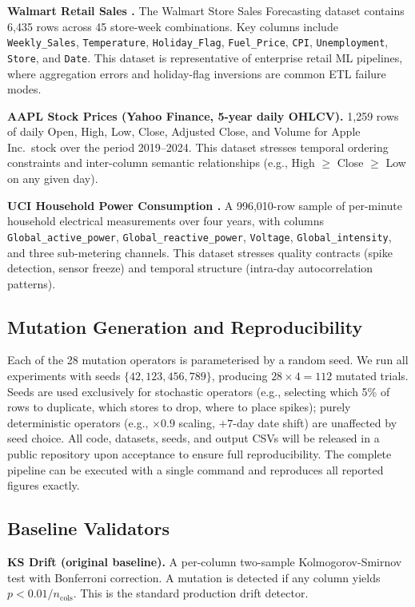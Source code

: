 \documentclass[journal]{IEEEtran}
\begin{document}
\textbf{Walmart Retail Sales \cite{walmart2014kaggle}.}  The Walmart Store
Sales Forecasting dataset contains 6,435 rows across 45 store-week
combinations.  Key columns include \texttt{Weekly\_Sales},
\texttt{Temperature}, \texttt{Holiday\_Flag}, \texttt{Fuel\_Price},
\texttt{CPI}, \texttt{Unemployment}, \texttt{Store}, and \texttt{Date}.
This dataset is representative of enterprise retail ML pipelines, where
aggregation errors and holiday-flag inversions are common ETL failure modes.

\textbf{AAPL Stock Prices (Yahoo Finance, 5-year daily OHLCV).}  1,259
rows of daily Open, High, Low, Close, Adjusted Close, and Volume for Apple
Inc.\ stock over the period 2019--2024.  This dataset stresses temporal
ordering constraints and inter-column semantic relationships (e.g.,
High $\geq$ Close $\geq$ Low on any given day).

\textbf{UCI Household Power Consumption \cite{uci2013}.}  A 996,010-row
sample of per-minute household electrical measurements over four years, with
columns \texttt{Global\_active\_power}, \texttt{Global\_reactive\_power},
\texttt{Voltage}, \texttt{Global\_intensity}, and three sub-metering
channels.  This dataset stresses quality contracts (spike detection, sensor
freeze) and temporal structure (intra-day autocorrelation patterns).

\subsection{Mutation Generation and Reproducibility}

Each of the 28 mutation operators is parameterised by a random seed.  We
run all experiments with seeds $\{42, 123, 456, 789\}$, producing
$28 \times 4 = 112$ mutated trials.  Seeds are used exclusively for
stochastic operators (e.g., selecting which 5\% of rows to duplicate, which
stores to drop, where to place spikes); purely deterministic operators
(e.g., $\times 0.9$ scaling, $+7$-day date shift) are unaffected by seed
choice.  All code, datasets, seeds, and output CSVs will be released in a
public repository upon acceptance to ensure full reproducibility.  The
complete pipeline can be executed with a single command and reproduces all
reported figures exactly.

\subsection{Baseline Validators}

\textbf{KS Drift (original baseline).}  A per-column two-sample
Kolmogorov-Smirnov test \cite{kolmogorov1933} with Bonferroni correction.
A mutation is detected if any column yields $p < 0.01 / n_{\mathrm{cols}}$.
This is the standard production drift detector.
\end{document}
